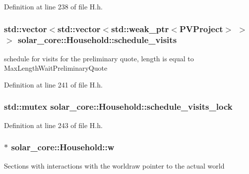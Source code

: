 Definition at line 238 of file H.\+h.

\hypertarget{classsolar__core_1_1_household_aadd4e3e2fc66ed214bcfadf37f557b14}{}
\subsubsection[{schedule\+\_\+visits}]{\setlength{\rightskip}{0pt plus 5cm}std\+::vector$<$std\+::vector$<$std\+::weak\+\_\+ptr$<${\bf P\+V\+Project}$>$ $>$ $>$ solar\+\_\+core\+::\+Household\+::schedule\+\_\+visits\hspace{0.3cm}{\ttfamily [protected]}}\label{classsolar__core_1_1_household_aadd4e3e2fc66ed214bcfadf37f557b14}
schedule for visits for the preliminary quote, length is equal to Max\+Length\+Wait\+Preliminary\+Quote 

Definition at line 241 of file H.\+h.

\hypertarget{classsolar__core_1_1_household_a15e598cfc419040a23f75fe08a8ef1d8}{}
\subsubsection[{schedule\+\_\+visits\+\_\+lock}]{\setlength{\rightskip}{0pt plus 5cm}std\+::mutex solar\+\_\+core\+::\+Household\+::schedule\+\_\+visits\+\_\+lock\hspace{0.3cm}{\ttfamily [protected]}}\label{classsolar__core_1_1_household_a15e598cfc419040a23f75fe08a8ef1d8}


Definition at line 243 of file H.\+h.

\hypertarget{classsolar__core_1_1_household_a01ac4643c725f397ba7485209a906e4d}{}
\subsubsection[{w}]{$\ast$ solar\+\_\+core\+::\+Household\+::w\hspace{0.3cm}{\ttfamily [protected]}}\label{classsolar__core_1_1_household_a01ac4643c725f397ba7485209a906e4d}
Sections with interactions with the worldraw pointer to the actual world 


